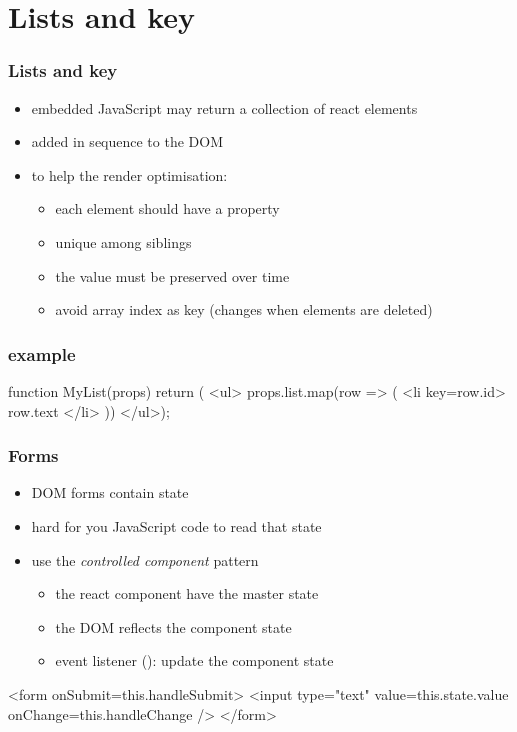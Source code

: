 \section{Lists and key}
\begin{frame}[fragile] \frametitle{Lists and key}
\begin{itemize}
  \item embedded JavaScript may return a collection of react elements
  \item added in sequence to the DOM
  \item to help the render optimisation:
  \begin{itemize}
    \item each element should have a  property
    \item unique among siblings
    \item the value must be preserved over time
    \item avoid array index as key (changes when elements are deleted)
  \end{itemize}
\end{itemize}
\end{frame}

\begin{frame}[fragile] \frametitle{ example}

\begin{CodeBox}{}
function MyList(props) { return (
  <ul>
    {props.list.map(row => (
      <li key={row.id}>
        {row.text}
      </li>
    ))}
  </ul>);
}
\end{CodeBox}
\end{frame}

\begin{frame}[fragile] \frametitle{Forms}
\begin{itemize}
  \item DOM forms contain state
  \item hard for you JavaScript code to read that state
  \item use the \emph{controlled component} pattern
  \begin{itemize}
    \item the react component have the master state
    \item the DOM reflects the component state
    \item event listener (): update the component state
  \end{itemize}
\end{itemize}
\vspace{5mm}
\begin{CodeBox}{}
<form onSubmit={this.handleSubmit}>
  <input type="text" 
        value={this.state.value}
        onChange={this.handleChange}
  />
</form>
\end{CodeBox}
\end{frame}

